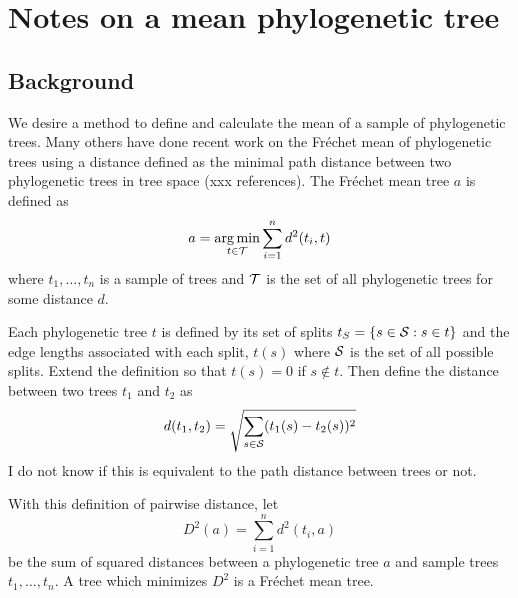 \documentclass[12pt,letterpaper]{tufte-handout}
\DeclareMathOperator*{\argmin}{arg\,min}
\begin{document}
\section{Notes on a mean phylogenetic tree}

\subsection{Background}

We desire a method to define and calculate the mean of a sample of phylogenetic trees.
Many others have done recent work on the Fr\'{e}chet mean of phylogenetic trees
using a distance defined as the minimal path distance between two phylogenetic trees in tree space (xxx references).
The Fr\'{e}chet mean tree $a$ is defined as
$$
a = \argmin_{t \in {\cal T}} \sum_{i=1}^n d^2(t_i,t)
$$
where $t_1,\ldots,t_n$ is a sample of trees and ${\cal T}$ is the set of all phylogenetic trees
for some distance $d$.

Each phylogenetic tree $t$ is defined by its set of splits $t_S = \{s \in {\cal S} : s \in t\}$ and
the edge lengths associated with each split, $t(s)$
where ${\cal S}$ is the set of all possible splits.
Extend the definition so that $t(s) = 0$ if $s \notin t$.
Then define the distance between two trees $t_1$ and $t_2$ as
$$
d(t_1,t_2) = \sqrt{ \sum_{s \in {\cal S}} (t_1(s) - t_2(s))^2 }
$$
I do not know if this is equivalent to the path distance between trees or not.

With this definition of pairwise distance,
let
$$
D^2(a) = \sum_{i=1}^n d^2(t_i,a)
$$
be the sum of squared distances between a phylogenetic tree $a$ and sample trees $t_1,\ldots,t_n$.
A tree which minimizes $D^2$ is a Fr\'{e}chet mean tree.
\end{document}
